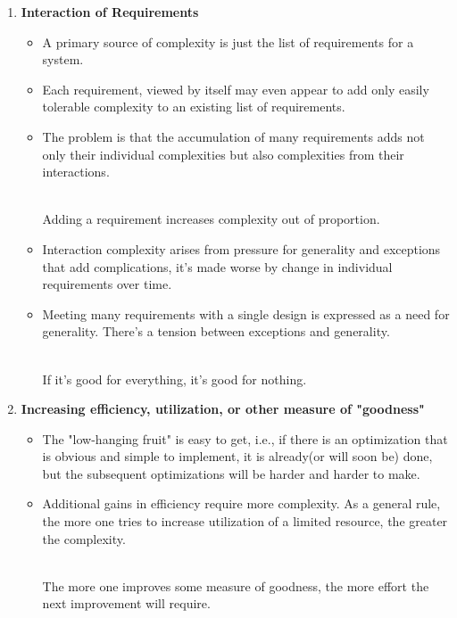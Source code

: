 \documentclass{article}
\begin{document}
\begin{enumerate}
    \item \textbf{Interaction of Requirements}
    \begin{itemize}
        \item A primary source of complexity is just the list of requirements for a system.
        \item Each requirement, viewed by itself may even appear to add only easily tolerable complexity to an existing list of requirements.
        \item The problem is that the accumulation of many requirements adds not only their individual complexities but also complexities from their interactions.
        \begin{tcolorbox} [title= Design Principle:, colback=black!10!white]
            \\
            Adding a requirement increases complexity out of proportion.
        \end{tcolorbox}

        \item Interaction complexity arises from pressure for generality and exceptions that add complications, it's made worse by change in individual requirements over time.
        \item Meeting many requirements with a single design is expressed as a need for generality. There's a tension between exceptions and generality.
        \begin{tcolorbox} [title= Design Principle:, colback=black!10!white]
            \\
            If it's good for everything, it's good for nothing.
        \end{tcolorbox}
    \end{itemize}

    \item \textbf{Increasing efficiency, utilization, or other measure of "goodness"}
    \begin{itemize}
        \item The "low-hanging fruit" is easy to get, i.e., if there is an optimization that is obvious and simple to implement, it is already(or will soon be) done, but the subsequent optimizations will be harder and harder to make.
        \item Additional gains in efficiency require more complexity. As a general rule, the more one tries to increase utilization of a limited resource, the greater the complexity. 
        \begin{tcolorbox} [title= Design Principle:, colback=black!10!white]
            \\
            The more one improves some measure of goodness, the more effort the next improvement will require.
        \end{tcolorbox}
    \end{itemize}

\end{enumerate}
\end{document}
